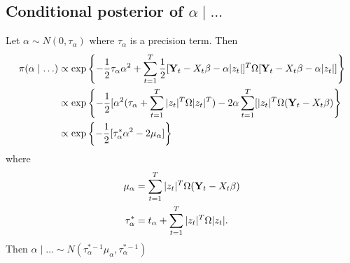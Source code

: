 \subsection*{Conditional posterior of $\alpha \mid \ldots$}\label{s:alphapost}
Let $\alpha \sim N(0, \tau_\alpha)$ where $\tau_\alpha$ is a precision term. Then
\begin{align*}
  \pi(\alpha \mid \ldots) &\propto \exp \left\{ -\frac{ 1 }{ 2 } \tau_\alpha \alpha^2 + \sum_{ t = 1 }^T \frac{ 1 }{ 2 } [\mbox{\bf Y}_t - X_t\beta - \alpha |z_t|]^T \Omega [\mbox{\bf Y}_t - X_t\beta - \alpha |z_t|] \right\} \\
      &\propto \exp \left\{ -\frac{ 1 }{ 2 } [\alpha^2(\tau_\alpha + \sum_{t = 1 }^T |z_t|^T \Omega |z_t|^T) - 2 \alpha \sum_{t=1}^T[|z_t|^T \Omega (\mbox{\bf Y}_t - X_t \beta) \right\}\\
      &\propto \exp \left\{ -\frac{ 1 }{ 2 } [\tau_\alpha^* \alpha^2 - 2 \mu_\alpha] \right\}
\end{align*}
where
\begin{align*}
  \mu_\alpha &= \sum_{t = 1}^T |z_t|^T \Omega (\mbox{\bf Y}_t - X_t \beta)\\
  \tau_\alpha^* &= t_\alpha + \sum_{t=1}^T |z_t|^T \Omega |z_t|.
\end{align*}
Then $\alpha \mid \ldots \sim N(\tau^{*-1}_\alpha \mu_\alpha, \tau^{*-1}_\alpha) $